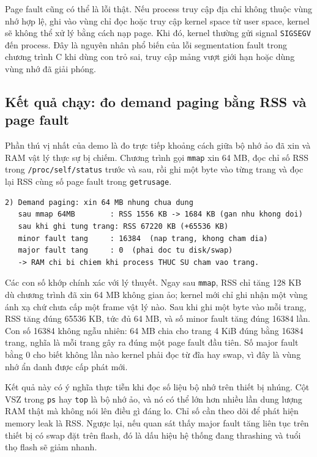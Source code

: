 \documentclass[11pt]{article}
\newcommand{\code}[1]{\texttt{#1}}
\begin{document}
Page fault cũng có thể là lỗi thật. Nếu process truy cập địa chỉ không thuộc vùng nhớ hợp lệ, ghi vào vùng chỉ đọc hoặc truy cập kernel space từ user space, kernel sẽ không thể xử lý bằng cách nạp page. Khi đó, kernel thường gửi signal \code{SIGSEGV} đến process. Đây là nguyên nhân phổ biến của lỗi segmentation fault trong chương trình C khi dùng con trỏ sai, truy cập mảng vượt giới hạn hoặc dùng vùng nhớ đã giải phóng.

\subsection{Kết quả chạy: đo demand paging bằng RSS và page fault}

Phần thú vị nhất của demo là đo trực tiếp khoảng cách giữa bộ nhớ ảo đã xin và RAM vật lý thực sự bị chiếm. Chương trình gọi \code{mmap} xin 64 MB, đọc chỉ số RSS trong \code{/proc/self/status} trước và sau, rồi ghi một byte vào từng trang và đọc lại RSS cùng số page fault trong \code{getrusage}.

\begin{lstlisting}[caption={Demand paging: xin 64 MB nhưng chưa chạm vào}]
2) Demand paging: xin 64 MB nhung chua dung
   sau mmap 64MB        : RSS 1556 KB -> 1684 KB (gan nhu khong doi)
   sau khi ghi tung trang: RSS 67220 KB (+65536 KB)
   minor fault tang     : 16384  (nap trang, khong cham dia)
   major fault tang     : 0  (phai doc tu disk/swap)
   -> RAM chi bi chiem khi process THUC SU cham vao trang.
\end{lstlisting}

Các con số khớp chính xác với lý thuyết. Ngay sau \code{mmap}, RSS chỉ tăng 128 KB dù chương trình đã xin 64 MB không gian ảo; kernel mới chỉ ghi nhận một vùng ánh xạ chứ chưa cấp một frame vật lý nào. Sau khi ghi một byte vào mỗi trang, RSS tăng đúng 65536 KB, tức đủ 64 MB, và số minor fault tăng đúng 16384 lần. Con số 16384 không ngẫu nhiên: 64 MB chia cho trang 4 KiB đúng bằng 16384 trang, nghĩa là mỗi trang gây ra đúng một page fault đầu tiên. Số major fault bằng 0 cho biết không lần nào kernel phải đọc từ đĩa hay swap, vì đây là vùng nhớ ẩn danh được cấp phát mới.

Kết quả này có ý nghĩa thực tiễn khi đọc số liệu bộ nhớ trên thiết bị nhúng. Cột VSZ trong \code{ps} hay \code{top} là bộ nhớ ảo, và nó có thể lớn hơn nhiều lần dung lượng RAM thật mà không nói lên điều gì đáng lo. Chỉ số cần theo dõi để phát hiện memory leak là RSS. Ngược lại, nếu quan sát thấy major fault tăng liên tục trên thiết bị có swap đặt trên flash, đó là dấu hiệu hệ thống đang thrashing và tuổi thọ flash sẽ giảm nhanh.
\end{document}
